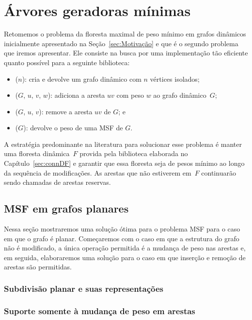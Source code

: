 \chapter{Árvores geradoras mínimas}


Retomemos o problema da floresta maximal de peso mínimo em grafos dinâmicos inicialmente apresentado na Seção~\ref{sec:Motivação} e que é o segundo problema que iremos apresentar. Ele consiste na busca por uma implementação tão eficiente quanto possível para a seguinte biblioteca:

\begin{itemize}
\item \MSFCreate($n$): cria e devolve um grafo dinâmico com $n$ vértices isolados;
\item \MSFaddEdge($G$, $u$, $v$, $w$): adiciona a aresta $uv$ com peso $w$ ao grafo dinâmico~$G$;
\item \MSFdelEdge($G$, $u$, $v$): remove a aresta $uv$ de $G$; e
\item \MSFweight($G$): devolve o peso de uma MSF de $G$.
\end{itemize}


A estratégia predominante na literatura para solucionar esse problema é manter uma floresta dinâmica~$F$ provida pela biblioteca
elaborada no Capítulo~\ref{sec:connDF} e garantir que essa floresta seja de pesos mínimo ao longo da
sequência de modificações. As arestas que não estiverem em~$F$ continuarão sendo chamadas de arestas
reservas.

\section{MSF em grafos planares}

Nessa seção mostraremos uma solução ótima para o problema MSF para o caso em que o grafo é planar.
Começaremos com o caso em que a estrutura do grafo não é modificado, a única operação permitida é a
mudança de peso nas arestas e, em seguida, elaboraremos uma solução para o caso em que inserção e
remoção de arestas são permitidas.

\subsection{Subdivisão planar e suas representações}

\subsection{Suporte somente à mudança de peso em arestas}


